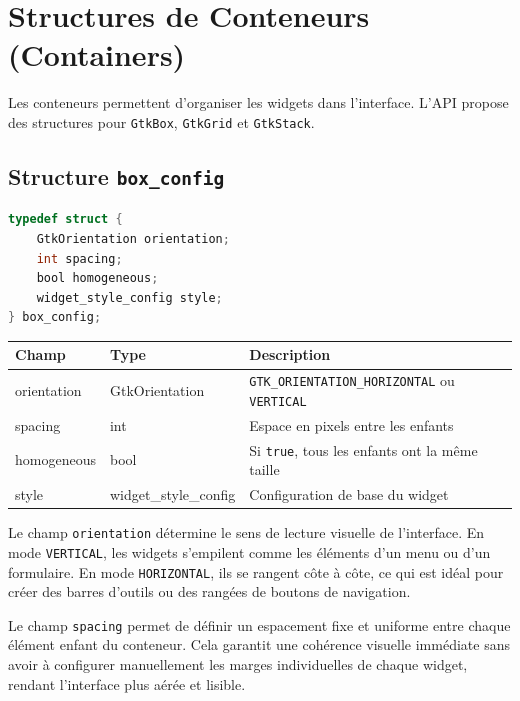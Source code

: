 \section{Structures de Conteneurs (Containers)}

Les conteneurs permettent d'organiser les widgets dans l'interface. L'API propose des structures pour \texttt{GtkBox}, \texttt{GtkGrid} et \texttt{GtkStack}.

\subsection{Structure \texttt{box\_config}}

\begin{lstlisting}[language=C]
typedef struct {
    GtkOrientation orientation;
    int spacing;
    bool homogeneous;
    widget_style_config style;
} box_config;
\end{lstlisting}

\begin{center}
\begin{tabular}{|l|l|p{5cm}|}
\hline
\textbf{Champ} & \textbf{Type} & \textbf{Description} \\
\hline
orientation & GtkOrientation & \texttt{GTK\_ORIENTATION\_HORIZONTAL} ou \texttt{VERTICAL} \\
\hline
spacing & int & Espace en pixels entre les enfants \\
\hline
homogeneous & bool & Si \texttt{true}, tous les enfants ont la même taille \\
\hline
style & widget\_style\_config & Configuration de base du widget \\
\hline
\end{tabular}
\end{center}

\bigskip

Le champ \texttt{orientation} détermine le sens de lecture visuelle de l'interface. En mode \texttt{VERTICAL}, les widgets s'empilent comme les éléments d'un menu ou d'un formulaire. En mode \texttt{HORIZONTAL}, ils se rangent côte à côte, ce qui est idéal pour créer des barres d'outils ou des rangées de boutons de navigation.

Le champ \texttt{spacing} permet de définir un espacement fixe et uniforme entre chaque élément enfant du conteneur. Cela garantit une cohérence visuelle immédiate sans avoir à configurer manuellement les marges individuelles de chaque widget, rendant l'interface plus aérée et lisible.

